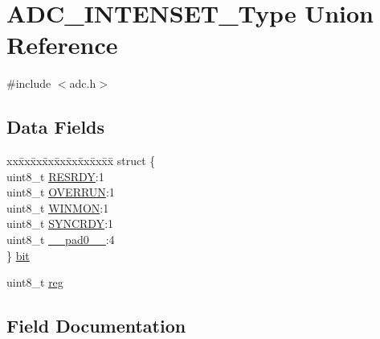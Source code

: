 \hypertarget{union_a_d_c___i_n_t_e_n_s_e_t___type}{}\section{A\+D\+C\+\_\+\+I\+N\+T\+E\+N\+S\+E\+T\+\_\+\+Type Union Reference}
\label{union_a_d_c___i_n_t_e_n_s_e_t___type}


{\ttfamily \#include $<$adc.\+h$>$}

\subsection*{Data Fields}
\begin{DoxyCompactItemize}
\item 
\begin{tabbing}
xx\=xx\=xx\=xx\=xx\=xx\=xx\=xx\=xx\=\kill
struct \{\\
\>uint8\_t \mbox{\hyperlink{union_a_d_c___i_n_t_e_n_s_e_t___type_a94751e8a3ff003866aebb8f5df19020d}{RESRDY}}:1\\
\>uint8\_t \mbox{\hyperlink{union_a_d_c___i_n_t_e_n_s_e_t___type_aaf049b0384a8e01c622391ab80c604d2}{OVERRUN}}:1\\
\>uint8\_t \mbox{\hyperlink{union_a_d_c___i_n_t_e_n_s_e_t___type_a5d973ab351fe45e44b765a6621d031ef}{WINMON}}:1\\
\>uint8\_t \mbox{\hyperlink{union_a_d_c___i_n_t_e_n_s_e_t___type_aece75e176e4fd55bf68937f1b56bde63}{SYNCRDY}}:1\\
\>uint8\_t \mbox{\hyperlink{union_a_d_c___i_n_t_e_n_s_e_t___type_a8b4eebe79ded0459acec2f4950102ba3}{\_\_pad0\_\_}}:4\\
\} \mbox{\hyperlink{union_a_d_c___i_n_t_e_n_s_e_t___type_a734dfc19cc09b09f6abe892b2515fbed}{bit}}\\

\end{tabbing}\item 
uint8\+\_\+t \mbox{\hyperlink{union_a_d_c___i_n_t_e_n_s_e_t___type_a9428adc9af4653a2050e2536b55dec8d}{reg}}
\end{DoxyCompactItemize}


\subsection{Field Documentation}
\mbox{\label{union_a_d_c___i_n_t_e_n_s_e_t___type_a8b4eebe79ded0459acec2f4950102ba3}} 
